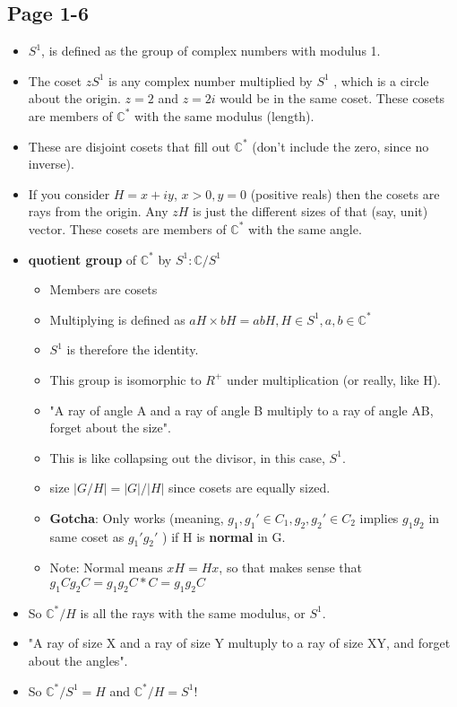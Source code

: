 \documentclass[11pt, oneside]{article}   	%
\begin{document}
\subsection{Page 1-6}
\begin{itemize}
\item $S^1$, is defined as the group of complex numbers with modulus 1.
\item The coset $zS^1$ is any complex number multiplied by $S^1$ , which is a circle about the origin.  $z=2$ and $z=2i$ would be in the same coset.  These cosets are members of $\mathbb{C}^*$ with the same modulus (length).
\item These are disjoint cosets that fill out $\mathbb{C}^*$ (don't include the zero, since no inverse).
\item If you consider $H=x+iy$, $x > 0, y=0$ (positive reals) then the cosets are rays from the origin.  Any $zH$ is just the different sizes of that (say, unit) vector.  These cosets are members of $\mathbb{C}^*$ with the same angle.
\item \textbf{quotient group} of $\mathbb{C}^*$ by $S^1: \mathbb{C} / S^1$
	\begin{itemize}
	\item Members are cosets
	\item Multiplying is defined as $aH \times bH = abH, H \in S^1, a,b \in \mathbb{C}^*$ 
	\item $S^1$ is therefore the identity.
	\item This group is isomorphic to $R^+$ under multiplication (or really, like H).
	\item "A ray of angle A and a ray of angle B multiply to a ray of angle AB, forget about the size".
	\item This is like collapsing out the divisor, in this case, $S^1$.
	\item size $|G / H| = |G| / |H|$ since cosets are equally sized.
	\item \textbf{Gotcha}: Only works (meaning, $g_1, g_1' \in C_1, g_2, g_2' \in C_2$ implies $g_1g_2$ in same coset as $g_1'g_2'$ ) if H is \textbf{normal} in G.  
	\item Note: Normal means $xH = Hx$, so that makes sense that $g_1Cg_2C = g_1g_2C*C=g_1g_2C$
	\end{itemize}
\item So $\mathbb{C}^* / H$ is all the rays with the same modulus, or $S^1$.  
\item	"A ray of size X and a ray of size Y multuply to a ray of size XY, and forget about the angles".
\item So $\mathbb{C}^* / S^1 = H$ and $\mathbb{C}^* / H = S^1$!
\end{itemize}
\end{document}
